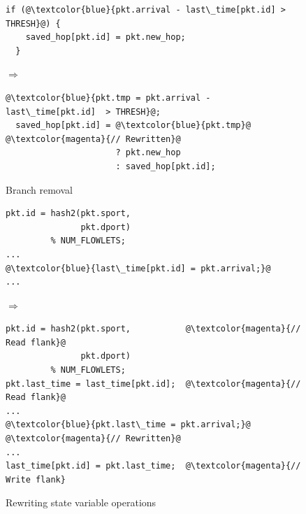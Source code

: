 \begin{figure}[!t]
  \hspace{-0.4in}
  \begin{minipage}{0.55\textwidth}
  \begin{small}
  \begin{lstlisting}[style=customcscriptsize, numbers=none, frame=none]
  if (@\textcolor{blue}{pkt.arrival - last\_time[pkt.id] > THRESH}@) {
    saved_hop[pkt.id] = pkt.new_hop;
  }
  \end{lstlisting}
  \end{small}
  \end{minipage}
%  
  \hspace{-0.3in}
  $\Longrightarrow$ 
  \hspace{-0.3in}
%  
  \begin{minipage}{0.6\textwidth}
  \begin{small}
  \begin{lstlisting}[style=customcscriptsize, numbers=none, frame=none]
  @\textcolor{blue}{pkt.tmp = pkt.arrival - last\_time[pkt.id]  > THRESH}@;
  saved_hop[pkt.id] = @\textcolor{blue}{pkt.tmp}@  @\textcolor{magenta}{// Rewritten}@
                      ? pkt.new_hop
                      : saved_hop[pkt.id];
  \end{lstlisting}
  \end{small}
  \end{minipage}
\caption{Branch removal}
\label{fig:if_convert}
\end{figure}

\begin{figure}[!t]
  \begin{minipage}{0.43\textwidth}
  \begin{small}
  \begin{lstlisting}[style=customcscriptsize, numbers=none, frame=none]
pkt.id = hash2(pkt.sport,
               pkt.dport)
         % NUM_FLOWLETS;
...
@\textcolor{blue}{last\_time[pkt.id] = pkt.arrival;}@
...
  \end{lstlisting}
  \end{small}
  \end{minipage}
%  
  \hspace{-0.5in}
  $\Longrightarrow$ 
  \hspace{-0.2in}
%  
  \begin{minipage}{0.61\textwidth}
  \begin{small}
  \begin{lstlisting}[style=customcscriptsize, numbers=none, frame=none]
pkt.id = hash2(pkt.sport,           @\textcolor{magenta}{// Read flank}@
               pkt.dport)
         % NUM_FLOWLETS;
pkt.last_time = last_time[pkt.id];  @\textcolor{magenta}{// Read flank}@
...
@\textcolor{blue}{pkt.last\_time = pkt.arrival;}@       @\textcolor{magenta}{// Rewritten}@
...
last_time[pkt.id] = pkt.last_time;  @\textcolor{magenta}{// Write flank}
  \end{lstlisting}
  \end{small}
  \end{minipage}
  \caption{Rewriting state variable operations}
\label{fig:stateful_flanks}
\end{figure}

